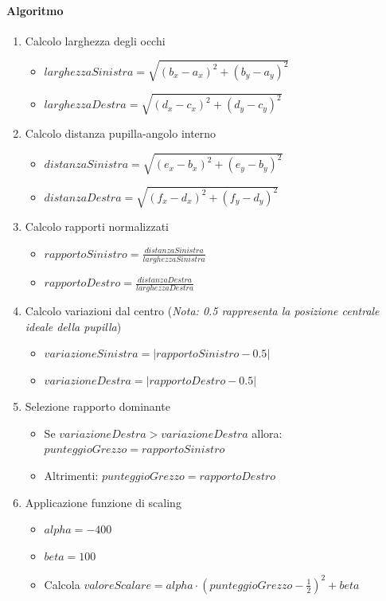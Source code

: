 \documentclass[12pt,a4paper,openright,twoside]{book}
\begin{document}
\paragraph{Algoritmo}
\begin{enumerate}
    \item Calcolo larghezza degli occhi \begin{itemize}
        \item \(larghezzaSinistra = \sqrt{(b_x - a_x)^2 + (b_y - a_y)^2}\)
        \item \(larghezzaDestra = \sqrt{(d_x - c_x)^2 + (d_y - c_y)^2}\)
    \end{itemize}
    \item Calcolo distanza pupilla-angolo interno \begin{itemize}
        \item \(distanzaSinistra = \sqrt{(e_x - b_x)^2 + (e_y - b_y)^2}\)
        \item \(distanzaDestra = \sqrt{(f_x - d_x)^2 + (f_y - d_y)^2}\)
    \end{itemize}
    \item Calcolo rapporti normalizzati \begin{itemize}
        \item \(rapportoSinistro = \frac{distanzaSinistra}{larghezzaSinistra}\)
        \item \(rapportoDestro = \frac{distanzaDestra}{larghezzaDestra}\)
    \end{itemize}
    \item Calcolo variazioni dal centro (\textit{Nota: 0.5 rappresenta la posizione centrale ideale della pupilla}) \begin{itemize}
        \item \(variazioneSinistra = |rapportoSinistro - 0.5| \)
        \item \(variazioneDestra = |rapportoDestro - 0.5| \)
    \end{itemize}
    \item Selezione rapporto dominante \begin{itemize}
        \item Se \(variazioneDestra > variazioneDestra \) allora: \(punteggioGrezzo = rapportoSinistro \)
        \item Altrimenti: \(punteggioGrezzo = rapportoDestro\)
    \end{itemize}
    \item Applicazione funzione di scaling \begin{itemize}
        \item \(alpha = -400\)
        \item \(beta = 100 \)
        \item Calcola \(valoreScalare = alpha \cdot (punteggioGrezzo - \frac{1}{2})^2 + beta\)
    \end{itemize}
\end{enumerate}
\end{document}
